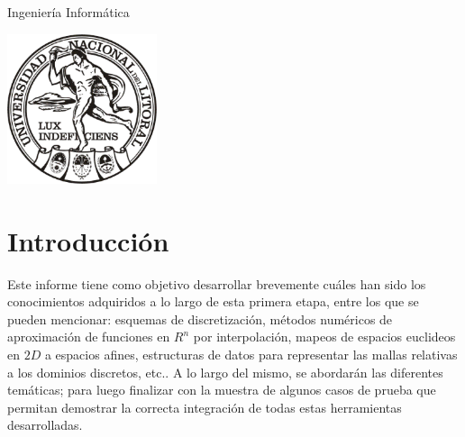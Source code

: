 \begin{titlepage}


  {\large
    Ingeniería Informática}\\[1cm] %
  
  \begin{center}
    \includegraphics[width=0.33\textwidth]{logo_unl.eps}\\[1cm] %
  \end{center}

  \vfill %
\end{titlepage}



\section{Introducción}

Este informe tiene como objetivo desarrollar brevemente cuáles han
sido los conocimientos adquiridos a lo largo de esta primera etapa, entre los que se pueden mencionar: esquemas de discretización, métodos
numéricos de aproximación de funciones en $ R^n$ por interpolación, mapeos de espacios euclideos en $2D$ a espacios afines, estructuras de datos para representar las mallas relativas a los dominios discretos, etc.. A lo largo del mismo, se abordarán las diferentes temáticas; para luego finalizar con la muestra de algunos casos de prueba que permitan demostrar la correcta integración de todas estas herramientas desarrolladas.



